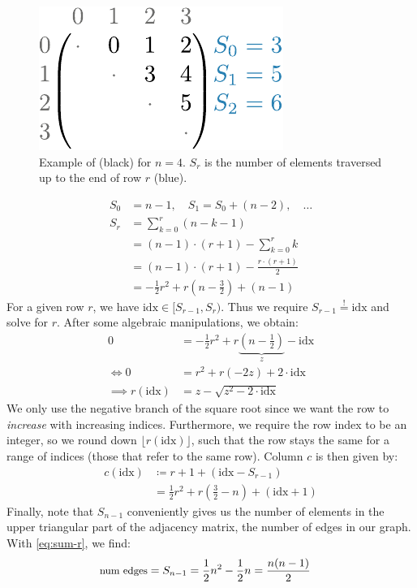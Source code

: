 \begin{figure}[H]
    \centering
    \includegraphics[width=0.5\linewidth]{assets/illustrator/sum-example.pdf}
    \caption{Example of  (black) for $n=4$. $S_r$ is the number of elements traversed up to the end of row $r$ (blue).}
    \label{fig:sum-example}
\end{figure}

\vspace{-3em}

\begin{align}
    S_0 &= n-1, \quad S_1 = S_0 + (n-2), \quad\ldots\\
    S_r &= \sum_{k=0}^{r} (n-k-1)\\[-10pt]
    &= (n-1) \cdot (r+1) - \sum_{k=0}^{r} k\\[-2pt]
    &= (n-1) \cdot (r+1) - \frac{r \cdot (r+1)}{2}\\[-4pt]
    &= -\frac{1}{2}r^2 + r \left(n- \frac{3}{2}\right) + (n-1)
    \label{eq:sum-r}
\end{align}
For a given row $r$, we have $\text{idx} \in [S_{r-1}, S_r)$. Thus we require $S_{r-1} \overset{!}{=} \text{idx}$ and solve for $r$. After some algebraic manipulations, we obtain:
\begin{align}
    0 &= -\frac{1}{2} r^2 + r \underbrace{\left(n - \frac{1}{2}\right)}_z - \text{idx}\\
    \iff 0 &= r^2 + r (-2z) + 2 \cdot \text{idx}\\
    \implies r(\text{idx}) &= z - \sqrt{z^2 - 2\cdot \text{idx}}
    \label{eq:row-index}
\end{align}
We only use the negative branch of the square root since we want the row to \textit{increase} with increasing indices. Furthermore, we require the row index to be an integer, so we round down $\lfloor r(\text{idx}) \rfloor$, such that the row stays the same for a range of indices (those that refer to the same row). Column $c$ is then given by:
\begin{align}
    c(\text{idx}) &\coloneqq r + 1 + (\text{idx} - S_{r-1})\\
    &= \frac{1}{2} r^2 + r \left(\frac{3}{2} - n\right) + (\text{idx} + 1)
    \label{eq:col-index}
\end{align}
Finally, note that $S_{n-1}$ conveniently gives us the number of elements in the upper triangular part of the adjacency matrix, \ie the number of edges in our graph. With \eqref{eq:sum-r}, we find:
\begin{align}
    \small{\text{num edges}}
    &= S_{n-1} = \frac{1}{2} n^2 - \frac{1}{2} n
    = \frac{n(n-1)}{2}
    \label{eq:num-edges}
\end{align}

